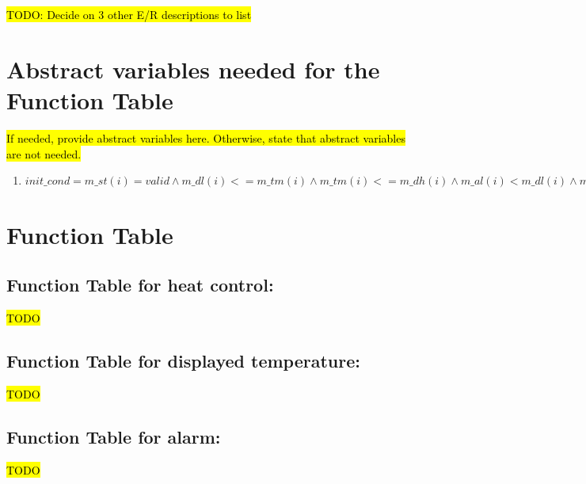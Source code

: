 \documentclass[fontsize=12pt,paper=letter,twoside]{scrartcl}
\begin{document}
\hl{TODO: Decide on 3 other E/R descriptions to list}

\section{Abstract variables needed for the Function Table}
\hl{If needed, provide abstract variables here. Otherwise, state that abstract variables are not needed.}

\begin{enumerate}
    \item $init\_cond = m\_st(i) = valid \wedge m\_dl(i) <= m\_tm(i) \wedge m\_tm(i) <= m\_dh(i) \wedge m\_al(i) < m\_dl(i) \wedge m\_dl(i) < m\_dh(i) \wedge m\_dh(i) < m\_ah(i)$
    \label{eq:initcond}
\end{enumerate}
\section{Function Table}

\subsection{Function Table for heat control: }
\hl{TODO}
\subsection{Function Table for displayed temperature: }
\hl{TODO}
\subsection{Function Table for alarm: }
\hl{TODO}
\end{document}
